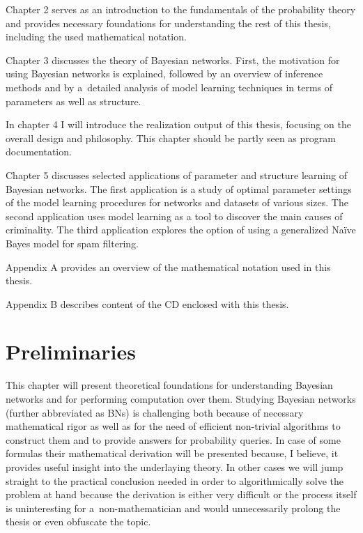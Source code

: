 \documentclass[english,cover]{fitthesis} %
\begin{document}
\medskip

Chapter 2 serves as an introduction to the fundamentals of the probability theory and provides necessary foundations for understanding the rest of this thesis, including the used mathematical notation.

Chapter 3 discusses the theory of Bayesian networks. First, the motivation for using Bayesian networks is explained, followed by an overview of inference methods and by a~detailed analysis of model learning techniques in terms of parameters as well as structure.

In chapter 4 I will introduce the realization output of this thesis, focusing on the overall design and philosophy. This chapter should be partly seen as program documentation.

Chapter 5 discusses selected applications of parameter and structure learning of Bayesian networks. The first application is a study of optimal parameter settings of the model learning procedures for networks and datasets of various sizes. The second application uses model learning as a tool to discover the main causes of criminality. The third application explores the option of using a generalized Naïve Bayes model for spam filtering.

Appendix A provides an overview of the mathematical notation used in this thesis.

Appendix B describes content of the CD enclosed with this thesis.































\chapter{Preliminaries}
This chapter will present theoretical foundations for understanding Bayesian networks and for performing computation over them. Studying Bayesian networks (further abbreviated as BNs) is challenging both because of necessary mathematical rigor as well as for the need of efficient non-trivial algorithms to construct them and to provide answers for probability queries. In case of some formulas their mathematical derivation will be presented because, I believe, it provides useful insight into the underlaying theory. In other cases we will jump straight to the practical conclusion needed in order to algorithmically solve the problem at hand because the derivation is either very difficult or the process itself is uninteresting for a~non-mathematician and would unnecessarily prolong the thesis or even obfuscate the topic.
\end{document}
